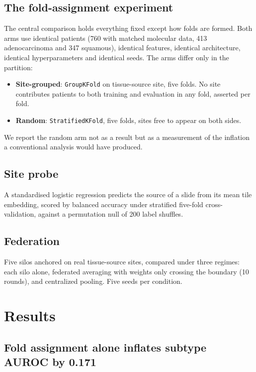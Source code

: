 \documentclass[11pt,a4paper]{article}
\begin{document}
\subsection{The fold-assignment experiment}

The central comparison holds everything fixed except how folds are formed. Both arms use
identical patients (760 with matched molecular data, 413 adenocarcinoma and 347 squamous),
identical features, identical architecture, identical hyperparameters and identical seeds. The
arms differ only in the partition:

\begin{itemize}[leftmargin=1.3em,itemsep=2pt]
\item \textbf{Site-grouped}: \texttt{GroupKFold} on tissue-source site, five folds. No site
      contributes patients to both training and evaluation in any fold, asserted per fold.
\item \textbf{Random}: \texttt{StratifiedKFold}, five folds, sites free to appear on both sides.
\end{itemize}

We report the random arm not as a result but as a measurement of the inflation a conventional
analysis would have produced.

\subsection{Site probe}

A standardised logistic regression predicts the source of a slide from its mean tile embedding,
scored by balanced accuracy under stratified five-fold cross-validation, against a permutation
null of 200 label shuffles.

\subsection{Federation}

Five silos anchored on real tissue-source sites, compared under three regimes: each silo alone,
federated averaging with weights only crossing the boundary (10 rounds), and centralized
pooling. Five seeds per condition.

\section{Results}

\subsection{Fold assignment alone inflates subtype AUROC by 0.171}
\end{document}
